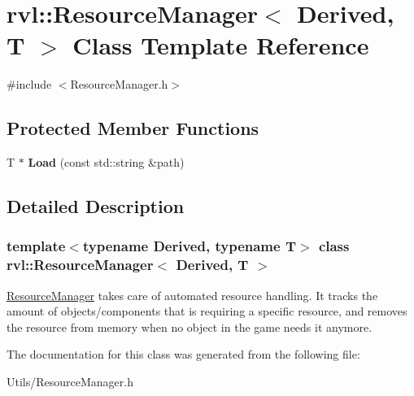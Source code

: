 \hypertarget{classrvl_1_1_resource_manager}{}\section{rvl\+:\+:Resource\+Manager$<$ Derived, T $>$ Class Template Reference}
\label{classrvl_1_1_resource_manager}


{\ttfamily \#include $<$Resource\+Manager.\+h$>$}

\subsection*{Protected Member Functions}
\begin{DoxyCompactItemize}
\item 
\mbox{\label{classrvl_1_1_resource_manager_abdb9d99cc50e50a463432a4409b3cd46}} 
T $\ast$ {\bfseries Load} (const std\+::string \&path)
\end{DoxyCompactItemize}


\subsection{Detailed Description}
\subsubsection*{template$<$typename Derived, typename T$>$\newline
class rvl\+::\+Resource\+Manager$<$ Derived, T $>$}

\hyperlink{classrvl_1_1_resource_manager}{Resource\+Manager} takes care of automated resource handling. It tracks the amount of objects/components that is requiring a specific resource, and removes the resource from memory when no object in the game needs it anymore. 

The documentation for this class was generated from the following file\+:\begin{DoxyCompactItemize}
\item 
Utils/Resource\+Manager.\+h\end{DoxyCompactItemize}
